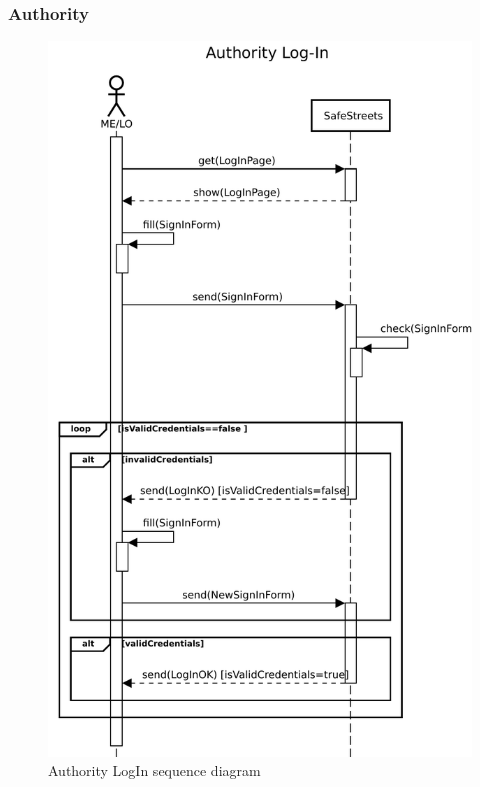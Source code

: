 					\subsubsection{Authority}
						\begin{figure}[!h]
								\centering
							\includegraphics[height=0.8\textheight] {images/SequenceDiagram/Authority/AuthorityLogIn.pdf}
								\caption{Authority LogIn sequence diagram}
						\end{figure}
						\clearpage
